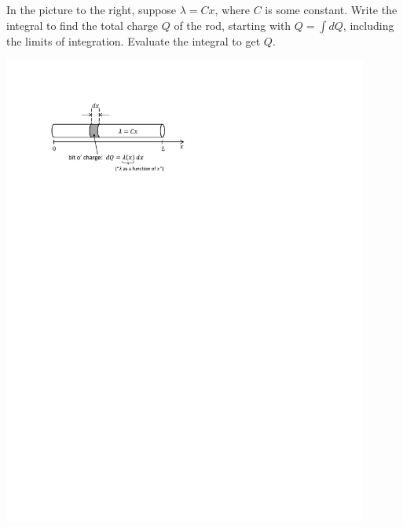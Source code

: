 \begin{enumerate}[labparts]
\vspace{-0.1in}
\begin{minipage}{0.54\textwidth}
\item In the picture to the right, suppose $\lambda = Cx$, where $C$ is some constant. Write the integral to find the total charge $Q$ of the rod, starting with $Q = \int dQ$, including the limits of integration.  Evaluate the integral to get $Q$.
\end{minipage}
\begin{minipage}{0.45\textwidth}
    \hspace{0.25in}\includegraphics[width=0.9\textwidth]{charge_density/fig3.pdf}
\end{minipage}
\answerspace{0.4 in}


\pagebreak[2]


\end{enumerate}
